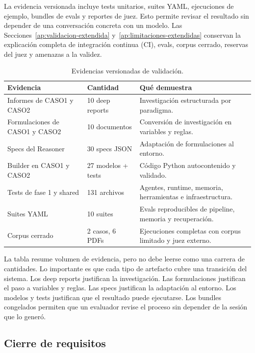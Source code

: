 La evidencia versionada incluye tests unitarios, suites YAML, ejecuciones de
ejemplo, bundles de evals y reportes de juez. Esto permite revisar el resultado
sin depender de una conversación concreta con un modelo.
Las Secciones~\ref{ap:validacion-extendida}
y~\ref{ap:limitaciones-extendidas} conservan la explicación completa de
integración continua (CI), evals, corpus cerrado, reservas del juez y amenazas
a la validez.

\begin{table}[H]
\begin{center}
\small
\begin{tabular}{|p{4.1cm}|p{2.1cm}|p{6.1cm}|} \hline
\textbf{Evidencia} & \textbf{Cantidad} & \textbf{Qué demuestra} \\ \hline
Informes de CASO1 y CASO2 & 10 deep reports & Investigación estructurada por paradigma. \\ \hline
Formulaciones de CASO1 y CASO2 & 10 documentos & Conversión de investigación en variables y reglas. \\ \hline
Specs del Reasoner & 30 specs JSON & Adaptación de formulaciones al entorno. \\ \hline
Builder en CASO1 y CASO2 & 27 modelos + tests & Código Python autocontenido y validado. \\ \hline
Tests de fase 1 y shared & 131 archivos & Agentes, runtime, memoria, herramientas e infraestructura. \\ \hline
Suites YAML & 10 suites & Evals reproducibles de pipeline, memoria y recuperación. \\ \hline
Corpus cerrado & 2 casos, 6 PDFs & Ejecuciones completas con corpus limitado y juez externo. \\ \hline
\end{tabular}
\caption{Evidencias versionadas de validación.}
\end{center}
\end{table}

La tabla resume volumen de evidencia, pero no debe leerse como una carrera de
cantidades. Lo importante es que cada tipo de artefacto cubre una transición del
sistema. Los deep reports justifican la investigación. Las formulaciones
justifican el paso a variables y reglas. Las specs justifican la adaptación al
entorno. Los modelos y tests justifican que el resultado puede ejecutarse. Los
bundles congelados permiten que un evaluador revise el proceso sin depender de
la sesión que lo generó.

\subsection{Cierre de requisitos}


